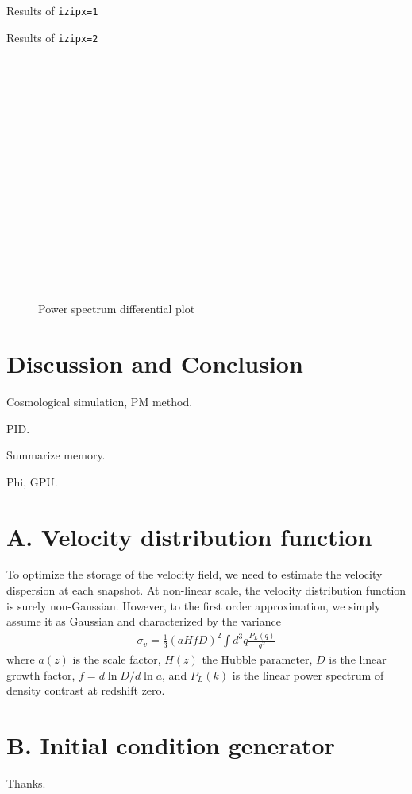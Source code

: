 \documentclass[10pt,twocolumn,preprint]{emulateapj}
\begin{document}
Results of {\tt izipx=1}

Results of {\tt izipx=2}

\begin{figure}[h]
\begin{verbatim}
















\end{verbatim}

\caption{Power spectrum differential plot}
\label{fig.power}
\end{figure}

\section{Discussion and Conclusion}
Cosmological simulation, PM method.

PID.

Summarize memory.

Phi, GPU.


\clearpage

\appendix
\section{A. Velocity distribution function}
To optimize the storage of the velocity field, we need to estimate the velocity dispersion at each snapshot. At non-linear scale, the velocity distribution function is surely non-Gaussian. However, to the first order approximation, we simply assume it as Gaussian and characterized by the variance
\begin{eqnarray}
\sigma_v = \frac{1}{3}  (a H f D)^2 \int d^3q \frac{P_{L}(q)}{q^2} 
\end{eqnarray}
where $a(z)$ is the scale factor, $H(z)$ the Hubble parameter, $D$ is the linear growth factor, $f=d \ln D/d\ln a$, 
and $P_L(k)$ is the linear power spectrum of density contrast at redshift zero. 

 

\section{B. Initial condition generator}


\acknowledgements
Thanks.



\end{document}
